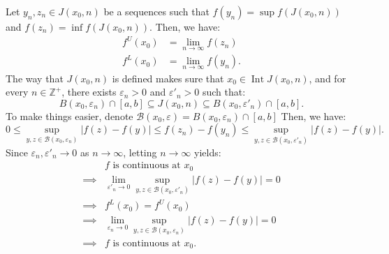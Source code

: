 \begin{enumerate}[label=\textbf{3B.\arabic*}]
  Let \( y_{n}, z_{n} \in J(x_{0}, n) \) be a sequences such that \( f(y_{n}) =
  \sup f(J(x_{0}, n)) \) and \( f(z_{n}) = \inf f(J(x_{0}, n)) \). Then, we
  have:
  \begin{align*}
    f^{U}(x_{0}) &= \lim_{n \to \infty} f(z_{n})\\
    f^{L}(x_{0}) &= \lim_{n \to \infty} f(y_{n})
  .\end{align*}
  The way that \( J(x_{0}, n) \) is defined makes sure that \( x_{0} \in
  \operatorname{Int} J(x_{0}, n) \), and for every \( n \in \mathbb{Z}^{+} \),
  there exists \( \varepsilon_{n} > 0 \) and \( \varepsilon'_{n} > 0 \) such
  that:
  \[
    B(x_{0}, \varepsilon_{n}) \cap [a, b] \subseteq J(x_{0}, n) \subseteq
    B(x_{0}, \varepsilon'_{n}) \cap [a, b]
  .\] To make things easier, denote \( \mathcal{B}(x_{0}, \varepsilon) =
  B(x_{0}, \varepsilon_{n}) \cap [a, b] \)
  Then, we have:
  \[
    0 \le \sup_{y,z \in \mathcal{B}(x_{0}, \varepsilon_{n})}
    |f(z)-f(y)| \le f(z_{n})-f(y_{n}) \le \sup _{y, z \in \mathcal{B}(x_{0},
    \varepsilon'_{n})} |f(z)-f(y)|
  .\] 
  Since \( \varepsilon_{n}, \varepsilon'_{n} \to 0 \) as \( n \to \infty \),
  letting \( n \to \infty \) yields:
  \begin{align*}
    &f \text{ is continuous at } x_{0}\\
    \implies &\lim_{\varepsilon'_{n} \to 0} \sup _{y, z \in \mathcal{B}(x_{0},
    \varepsilon'_{n})} |f(z)-f(y)| = 0\\
    \implies &f^{L}(x_{0}) = f^{U}(x_{0})\\
    \implies &\lim_{\varepsilon_{n} \to 0} \sup _{y, z \in \mathcal{B}(x_{0},
    \varepsilon_{n})} |f(z)-f(y)| = 0\\
    \implies &f \text{ is continuous at } x_{0}
  .\end{align*}


\end{enumerate}
